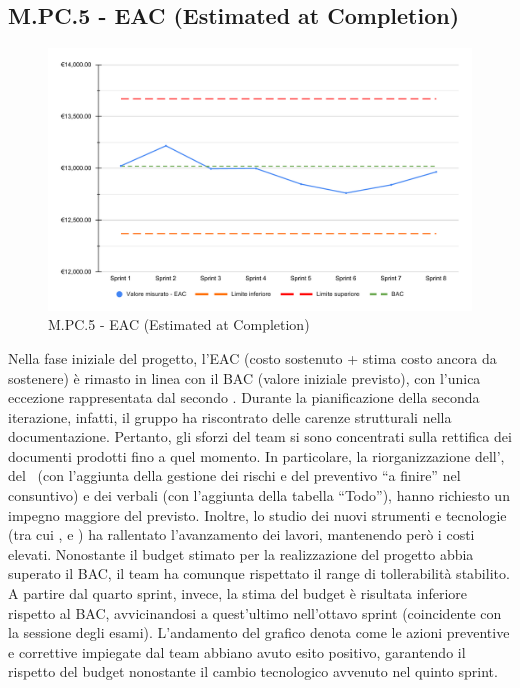 \subsection{M.PC.5 - EAC (Estimated at Completion)}
\begin{figure}[H]
    \centering
    \includegraphics[width=\textwidth]{assets/stima_a_finire.pdf}
    \caption{M.PC.5 - EAC (Estimated at Completion)}
\end{figure}

\par Nella fase iniziale del progetto, l'EAC (costo sostenuto + stima costo ancora da sostenere) è rimasto in linea con il BAC (valore iniziale previsto), con l’unica eccezione rappresentata dal secondo . Durante la pianificazione della seconda iterazione, infatti, il gruppo ha riscontrato delle carenze strutturali nella documentazione. Pertanto, gli sforzi del team si sono concentrati sulla rettifica dei documenti prodotti fino a quel momento. In particolare, la riorganizzazione dell'\AdR, del \PdP\ (con l'aggiunta della gestione dei rischi e del preventivo “a finire” nel consuntivo) e dei verbali (con l’aggiunta della tabella “Todo”), hanno richiesto un impegno maggiore del previsto. Inoltre, lo studio dei nuovi strumenti e tecnologie (tra cui ,  e ) ha rallentato l’avanzamento dei lavori, mantenendo però i costi elevati. Nonostante il budget stimato per la realizzazione del progetto abbia superato il BAC, il team ha comunque rispettato il range di tollerabilità stabilito. A partire dal quarto sprint, invece, la stima del budget è risultata inferiore rispetto al BAC, avvicinandosi a quest’ultimo nell’ottavo sprint (coincidente con la sessione degli esami). L’andamento del grafico denota come le azioni preventive e correttive impiegate dal team abbiano avuto esito positivo, garantendo il rispetto del budget nonostante il cambio tecnologico avvenuto nel quinto sprint.